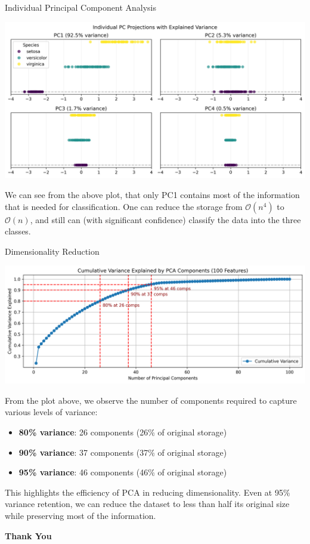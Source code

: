 \documentclass{beamer}
\begin{document}
\begin{frame}{Individual Principal Component Analysis}
    \begin{center}
        \includegraphics[width=0.8\linewidth]{images/pca/components.png} \\
    \end{center}

    We can see from the above plot, that only PC1 contains most of the information that is needed for classification. One can reduce the storage from $\mathcal{O}(n^4)$ to $\mathcal{O}(n)$, and still can (with significant confidence) classify the data into the three classes. 
\end{frame}



\begin{frame}{Dimensionality Reduction}
     \begin{center}
        \includegraphics[width=0.8\linewidth]{images/pca/cumulative_variance.png} \\
    \end{center}

    \small{
        From the plot above, we observe the number of components required to capture various levels of variance:
    
        \begin{itemize}
            \item \textbf{80\% variance}: 26 components (26\% of original storage)
            \item \textbf{90\% variance}: 37 components (37\% of original storage)
            \item \textbf{95\% variance}: 46 components (46\% of original storage)
        \end{itemize}
        
        This highlights the efficiency of PCA in reducing dimensionality. Even at 95\% variance retention, we can reduce the dataset to less than half its original size while preserving most of the information.
    }
    
\end{frame}


\begin{frame}{}
    \LARGE \centering \textbf{Thank You}
\end{frame}
\end{document}
